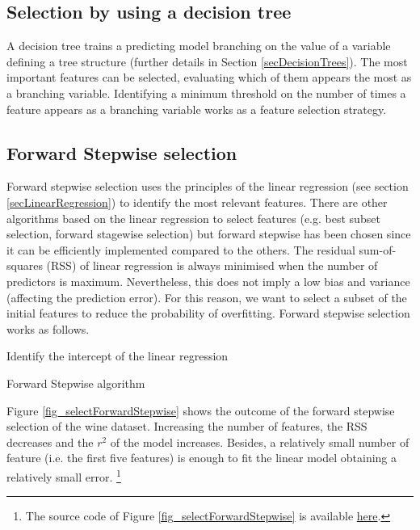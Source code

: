 \subsection{Selection by using a decision tree}
A decision tree trains a predicting model branching on the value of a variable defining a tree structure (further details in Section \ref{secDecisionTrees}). The most important features can be selected, evaluating which of them appears the most as a branching variable. Identifying a minimum threshold on the number of times a feature appears as a branching variable works as a feature selection strategy.

\subsection{Forward Stepwise selection}

Forward stepwise selection uses the principles of the linear regression (see section \ref{secLinearRegression}) to identify the most relevant features. There are other algorithms based on the linear regression to select features (e.g. best subset selection, forward stagewise selection) but forward stepwise has been chosen since it can be efficiently implemented compared to the others. The residual sum-of-squares (RSS) of linear regression is always minimised when the number of predictors is maximum. Nevertheless, this does not imply a low bias and variance (affecting the prediction error). For this reason, we want to select a subset of the initial features to reduce the probability of overfitting. Forward stepwise selection works as follows.

\begin{algorithm}[H]
\DontPrintSemicolon
\SetAlgoLined
Identify the intercept of the linear regression\;

\caption{Forward Stepwise algorithm} \label{secForwardStepwise}
\label{algo_forwardStepwise}
\end{algorithm}

Figure \ref{fig_selectForwardStepwise} shows the outcome of the forward stepwise selection of the wine dataset. Increasing the number of features, the RSS decreases and the $r^2$ of the model increases. Besides, a relatively small number of feature (i.e. the first five features) is enough to fit the linear model obtaining a relatively small error. \footnote{The source code of Figure \ref{fig_selectForwardStepwise} is available \href{https://github.com/aletuf93/logproj/blob/master/examples/05.\%20Dimensionality\%20Reduction.ipynb}{here}.} 

